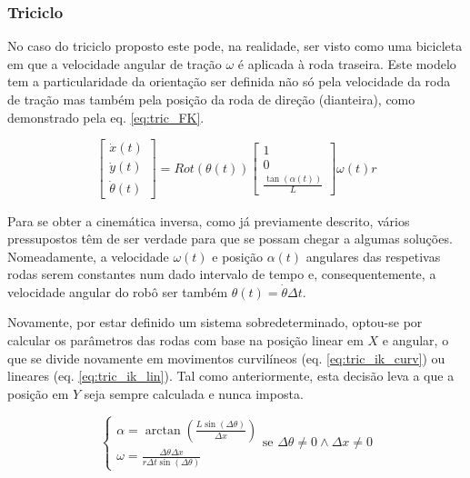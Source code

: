 \documentclass[twocolumn]{article}
\begin{document}
\subsubsection{Triciclo}

No caso do triciclo proposto este pode, na realidade, ser visto como uma bicicleta em que a velocidade angular de tração $\omega$ é aplicada à roda traseira. Este modelo tem a particularidade da orientação ser definida não só pela velocidade da roda de tração mas também pela posição da roda de direção (dianteira), como demonstrado pela eq. \ref{eq:tric_FK}.

\begin{equation}
    \begin{bmatrix}
        \dot{x}(t) \\
        \dot{y}(t) \\
        \dot{\theta}(t) 
    \end{bmatrix} = 
    Rot(\theta(t))
    \begin{bmatrix}
        1 \\
        0 \\
        \frac{\tan(\alpha(t))}{L}
    \end{bmatrix} \omega(t) r
    \label{eq:tric_FK}
\end{equation}

Para se obter a cinemática inversa, como já previamente descrito, vários pressupostos têm de ser verdade para que se possam chegar a algumas soluções. Nomeadamente, a velocidade $\omega (t)$ e posição $\alpha (t)$ angulares das respetivas rodas serem constantes num dado intervalo de tempo e, consequentemente, a velocidade angular do robô ser também $\theta (t) = \dot{\theta} \Delta t$. 

Novamente, por estar definido um sistema sobredeterminado, optou-se por calcular os parâmetros das rodas com base na posição linear em $X$ e angular, o que se divide novamente em movimentos curvilíneos (eq. \ref{eq:tric_ik_curv}) ou lineares (eq. \ref{eq:tric_ik_lin}). Tal como anteriormente, esta decisão leva a que a posição em $Y$ seja sempre calculada e nunca imposta.

\begin{equation}
    \begin{cases}
        \alpha = \arctan\left(\frac{L \sin{\left(\Delta \theta \right)}}{\Delta x} \right) \\
        \omega = \frac{\Delta \theta \Delta x}{r \Delta t \sin{\left(\Delta \theta \right)}}
    \end{cases}
    \text{se } \Delta \theta \neq 0 \wedge \Delta x \neq 0
    \label{eq:tric_ik_curv}
\end{equation}
\end{document}
